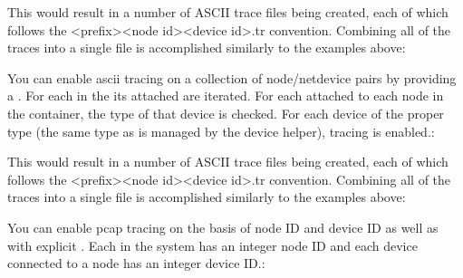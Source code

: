 \documentclass[letterpaper,10pt,english]{sphinxmanual}
\renewcommand{\sphinxcode}[1]{\texttt{\small{#1}}}
\begin{document}
This would result in a number of ASCII trace files being created, each of which
follows the \textless{}prefix\textgreater{}\sphinxhyphen{}\textless{}node id\textgreater{}\sphinxhyphen{}\textless{}device id\textgreater{}.tr convention. Combining all of the
traces into a single file is accomplished similarly to the examples above:

\begin{sphinxVerbatim}[commandchars=\\\{\}]
   
    
  
\end{sphinxVerbatim}

You can enable ascii tracing on a collection of node/net\sphinxhyphen{}device pairs by
providing a \sphinxcode{}. For each \sphinxcode{} in the \sphinxcode{} its
attached \sphinxcode{} are iterated.  For each \sphinxcode{} attached to each
node in the container, the type of that device is checked.  For each device of
the proper type (the same type as is managed by the device helper), tracing is
enabled.:

\begin{sphinxVerbatim}[commandchars=\\\{\}]
 
  
\end{sphinxVerbatim}

This would result in a number of ASCII trace files being created, each of which
follows the \textless{}prefix\textgreater{}\sphinxhyphen{}\textless{}node id\textgreater{}\sphinxhyphen{}\textless{}device id\textgreater{}.tr convention. Combining all of the
traces into a single file is accomplished similarly to the examples above:

You can enable pcap tracing on the basis of node ID and device ID as well as
with explicit \sphinxcode{}. Each \sphinxcode{} in the system has an integer node ID and
each device connected to a node has an integer device ID.:
\end{document}
